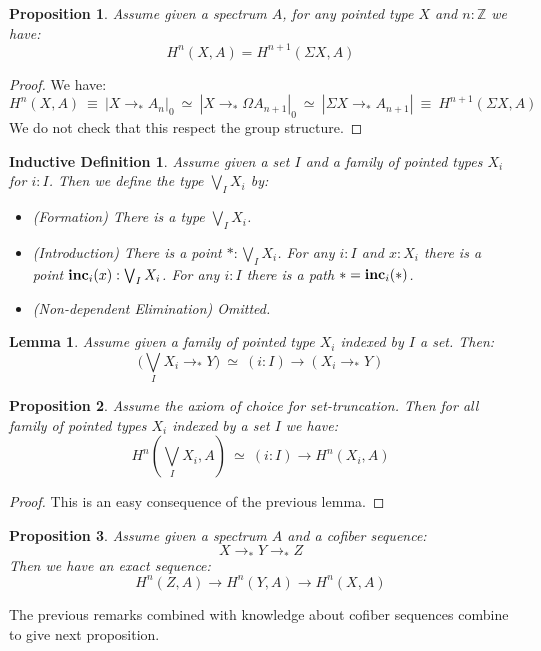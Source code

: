 \documentclass{article}
\renewcommand{\r}{\rightarrow}
\newtheorem{lemma}{Lemma}
\newtheorem{proposition}{Proposition}
\newtheorem{ind_def}{Inductive Definition}
\begin{document}
\begin{proposition}
Assume given a spectrum $A$, for any pointed type $X$ and $n:\mathbb{Z}$ we have:
\[H^n(X,A) = H^{n+1}(\Sigma X,A)\]
\end{proposition}
\begin{proof}
We have:
\[H^n(X,A) \ \equiv\ |X\r_* A_n|_0 \ \simeq \ |X\r_*\Omega A_{n+1}|_0 \ \simeq \ |\Sigma X \r_* A_{n+1}| \ \equiv\ H^{n+1}(\Sigma X , A)\]
We do not check that this respect the group structure.
\end{proof}

\begin{ind_def}
Assume given a set $I$ and a family of pointed types $X_i$ for $i:I$. Then we define the type $\bigvee_I X_i$ by:
\begin{itemize}
\item (Formation) There is a type $\bigvee_I X_i$.
\item (Introduction) There is a point $*:\bigvee_I X_i$.
For any $i:I$ and $x:X_i$ there is a point $\mathrm{\bf inc}_i(x) : \bigvee_I X_i$.
For any $i:I$ there is a path $* = \mathrm{\bf inc}_i(*)$.
\item (Non-dependent Elimination) Omitted.
\end{itemize} 
\end{ind_def}

\begin{lemma}
Assume given a family of pointed type $X_i$ indexed by $I$ a set. Then:
\[\big(\bigvee_I X_i \r_* Y\big) \ \simeq\ (i:I) \r (X_i\r_* Y)\]
\end{lemma}

\begin{proposition}
Assume the axiom of choice for set-truncation. Then for all family of pointed types $X_i$ indexed by a set $I$ we have:
\[H^n(\bigvee_I X_i , A) \ \simeq\ (i:I) \r H^n(X_i,A)\]
\end{proposition}
\begin{proof}
This is an easy consequence of the previous lemma.
\end{proof}

\begin{proposition}
Assume given a spectrum $A$ and a cofiber sequence: 
\[X\r_* Y\r_* Z\]
Then we have an exact sequence:
\[H^n(Z,A) \r H^n(Y,A) \r H^n(X,A) \]
\end{proposition}

The previous remarks combined with knowledge about cofiber sequences combine to give next proposition.
\end{document}
